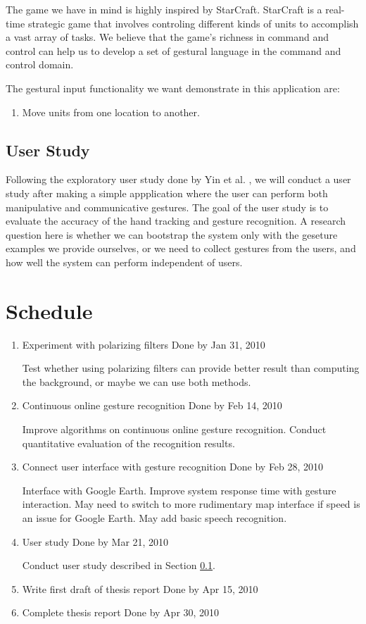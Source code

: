 The game we have in mind is highly inspired by StarCraft. StarCraft is a
real-time strategic game that involves controling different kinds of units to
accomplish a vast array of tasks. We believe that the game's richness in command
and control can help us to develop a set of gestural language in the command and
control domain.

The gestural input functionality we want demonstrate in this application are:

\begin{enumerate}
  \item Move units from one location to another.
\end{enumerate}

\subsection{User Study}\label{sec:userStudy}
Following the exploratory user study done by Yin et al. \cite{yin10}, we will
conduct a user study after making a simple appplication where the user can
perform both manipulative and communicative gestures. The goal of the user study
is to evaluate the accuracy of the hand tracking and gesture recognition. A
research question here is whether we can bootstrap the system only with the
geseture examples we provide ourselves, or we need to collect gestures from the
users, and how well the system can perform independent of users.

\section{Schedule}
\begin{enumerate}
  \item Experiment with polarizing filters \hfill Done by Jan 31, 2010

  Test whether using polarizing filters can provide better result than computing
the background, or maybe we can use both methods.

  \item Continuous online gesture recognition \hfill Done by Feb 14, 2010

  Improve algorithms on continuous online gesture recognition. Conduct
quantitative evaluation of the recognition results.

  \item Connect user interface with gesture recognition	\hfill Done by Feb 28,
2010

  Interface with Google Earth. Improve system response time with gesture
interaction. May need to switch to more rudimentary map interface if speed is an issue for Google Earth. May add basic speech recognition.

  \item User study \hfill Done by Mar 21, 2010

  Conduct user study described in Section \ref{sec:userStudy}.

  \item Write first draft of thesis report \hfill Done by Apr 15, 2010
  \item Complete thesis report	\hfill Done by Apr 30, 2010
  \end{enumerate}

